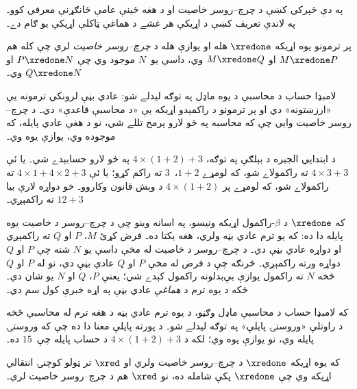 \documentclass[../../../include/open-logic-section]{subfiles}
\begin{document}


په دې څپرکي کښې د چرچ--روسر خاصيت او د هغه ځينې عامې
ځانګړنې معرفي کوو۔ په لاندې تعريف کښې د اړيکې هر غشے د هماغې ټاکلې اړيکې يو ګام دے۔

\begin{defn} پر ترمونو يوه اړيکه
  $\xredone$ هله او يوازې هله د \emph{چرچ--روسر خاصيت} لري
  چې کله هم $M \xredone P$ او $M \xredone Q$ وي، داسې يو~$N$
  موجود وي چې $P \xredone N$ او $Q \xredone N$ وي۔
\end{defn}

لامبډا حساب د محاسبې د يوه ماډل په توګه ليدلے شو: عادي بڼې
لرونکي ترمونه يې «ارزښتونه» دي او پر ترمونو د راکمېدو اړيکه يې
«د محاسبې قاعدې» دي۔ د چرچ--روسر خاصيت وايي چې که محاسبه په
څو لارو پرمخ تللے شي، نو د هغې عادي پايله، که موجوده وي، يوازې
يوه وي۔

د ابتدايي الجبره د بېلګې په توګه، $4 \times (1+2) + 3$ په څو
لارو حسابېدے شي۔ يا ئې $4 \times 3+3$ ته راکمولاے شو، که
لومړے $1+2$،~$3$ ته راکم کړو؛ يا ئې $4 \times 1+4
\times 2+3$ ته راکمولاے شو، که لومړے پر $4 \times (1+2)$
د وېش قانون وکاروو۔ خو دواړه لارې بيا $12+3$ ته راکمېږي۔

که $\xredone$ د $\beta$-راکمول اړيکه ونيسو، په اسانه وينو
چې د چرچ--روسر د خاصيت يوه پايله دا ده: که يو ترم عادي بڼه
ولري، هغه يکتا ده۔ فرض کړئ $M$، $P$ او $Q$ ته راکمېږي
او دواړه عادي بڼې دي۔ د چرچ--روسر د خاصيت له مخې داسې يو
$N$ شته چې $P$ او $Q$ دواړه ورته راکمېږي۔ څرنګه چې د فرض
له مخې $P$ او $Q$ عادي بڼې دي، نو له $P$ او $Q$ څخه $N$
ته راکمول يوازې بې‌بدلونه راکمول کېدے شي؛ يعنې $P$، $Q$
او $N$ يو شان دي۔ ځکه د يوه ترم د \emph{هماغې} عادي بڼې
په اړه خبرې کول سم دي۔

که لامبډا حساب د محاسبې ماډل وګڼو، د يوه ترم عادي بڼه د
هغه ترم له محاسبې څخه د راوتلې «وروستۍ پايلې» په توګه ليدلے
شو۔ د پورته پايلې معنا دا ده چې که وروستۍ پايله وي، نو يوازې
يوه وي؛ لکه د $4 \times (1+2)+3$ د حساب پايله چې~$15$ ده۔

\begin{thm} 
  که يوه اړيکه $\xredone$ د چرچ--روسر خاصيت ولري او $\xred$
  تر ټولو کوچنۍ انتقالي اړيکه وي چې $\xredone$ پکې شامله ده،
  نو $\xred$ هم د چرچ--روسر خاصيت لري۔
\end{thm}
\end{document}
